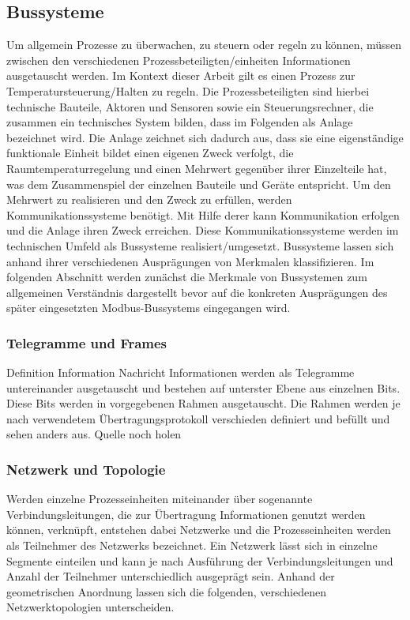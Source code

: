 \subsection{Bussysteme} 
Um allgemein Prozesse zu überwachen, zu steuern oder regeln zu können, müssen zwischen den verschiedenen Prozessbeteiligten/einheiten Informationen ausgetauscht werden. Im Kontext dieser Arbeit gilt es einen Prozess zur Temperatursteuerung/Halten zu regeln. Die Prozessbeteiligten sind hierbei technische Bauteile, Aktoren und Sensoren sowie ein Steuerungsrechner, die zusammen ein technisches System bilden, dass im Folgenden als Anlage bezeichnet wird. Die Anlage zeichnet sich dadurch aus, dass sie eine eigenständige funktionale Einheit bildet einen eigenen Zweck verfolgt, die Raumtemperaturregelung und einen Mehrwert gegenüber ihrer Einzelteile hat, was dem Zusammenspiel der einzelnen Bauteile und Geräte entspricht. 
Um den Mehrwert zu realisieren und den Zweck zu erfüllen, werden Kommunikationssysteme benötigt. Mit Hilfe derer kann Kommunikation erfolgen und die Anlage ihren Zweck erreichen.
Diese Kommunikationssysteme werden im technischen Umfeld als Bussysteme realisiert/umgesetzt.
Bussysteme lassen sich anhand ihrer verschiedenen Ausprägungen von Merkmalen klassifizieren. Im folgenden Abschnitt werden zunächst die Merkmale von Bussystemen zum allgemeinen Verständnis dargestellt bevor auf die konkreten Ausprägungen des später eingesetzten Modbus-Bussystems eingegangen wird.


\subsubsection{Telegramme und Frames}
Definition Information Nachricht
Informationen werden als Telegramme untereinander ausgetauscht und bestehen auf unterster Ebene aus einzelnen Bits. Diese Bits werden in vorgegebenen Rahmen ausgetauscht. Die Rahmen werden je nach verwendetem Übertragungsprotokoll verschieden definiert und befüllt und sehen anders aus.
Quelle noch holen



\subsubsection{Netzwerk und Topologie}

Werden einzelne Prozesseinheiten miteinander über sogenannte Verbindungsleitungen, die zur Übertragung Informationen genutzt werden können, verknüpft, entstehen dabei Netzwerke und die Prozesseinheiten werden als Teilnehmer des Netzwerks bezeichnet. Ein Netzwerk lässt sich in einzelne Segmente einteilen und kann je nach Ausführung der Verbindungsleitungen und Anzahl der Teilnehmer unterschiedlich ausgeprägt sein. Anhand der geometrischen Anordnung lassen sich die folgenden, verschiedenen Netzwerktopologien unterscheiden.



